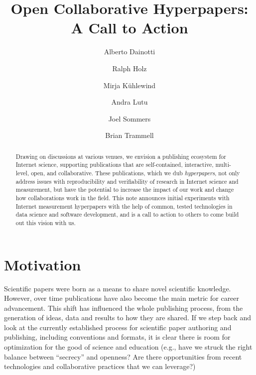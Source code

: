 \documentclass[sigconf]{acmart}
\begin{document}
\title{Open Collaborative Hyperpapers: A Call to Action}

\author{Alberto Dainotti}

\author{Ralph Holz}

\author{Mirja K\"uhlewind}

\author{Andra Lutu}

\author{Joel Sommers}

\author{Brian Trammell}


\begin{abstract}
	Drawing on discussions at various venues, we envision a publishing ecosystem
	for Internet science, supporting publications that are self-contained,
	interactive, multi-level, open, and collaborative. These publications, which
	we dub \emph{hyperpapers}, not only address issues with reproducibility and
	verifiability of research in Internet science and measurement, but have the
	potential to increase the impact of our work and change how collaborations
	work in the field. This note announces initial experiments with Internet
	measurement hyperpapers with the help of common, tested technologies in data
	science and software development, and is a call to action to others to come
	build out this vision with us.
\end{abstract}

\maketitle

\section{Motivation}\label{sec:intro}

Scientific papers were born as a means to share novel scientific knowledge.
However, over time publications have also become the main metric for career
advancement. This shift has influenced the whole publishing process, from the
generation of ideas, data and results to how they are shared. If we step back
and look at the currently established process for scientific paper authoring and
publishing, including conventions and formats, it is clear there is room for
optimization for the good of science and education (e.g.,  have we struck the
right balance between “secrecy” and openness? Are there opportunities from
recent technologies and collaborative practices that we can leverage?)
\end{document}
